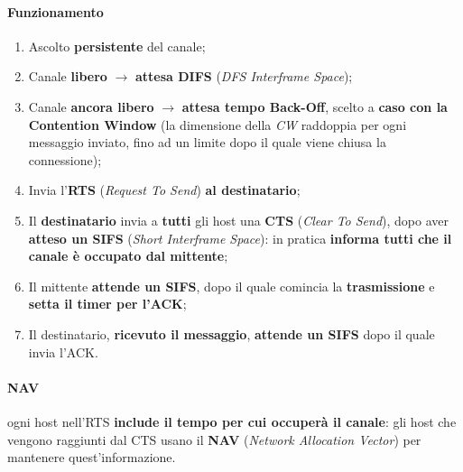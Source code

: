 \documentclass[a4paper]{article}
\begin{document}
			\paragraph{Funzionamento}
				\begin{enumerate}
					\item Ascolto \textbf{persistente} del canale;
					\item Canale \textbf{libero} $ \rightarrow $ \textbf{attesa DIFS} (\emph{DFS Interframe Space});
					\item Canale \textbf{ancora libero} $ \rightarrow $ \textbf{attesa tempo Back-Off}, scelto a \textbf{caso con la Contention Window} (la dimensione della \emph{CW} raddoppia per ogni messaggio inviato, fino ad un limite dopo il quale viene chiusa la connessione);
					\item Invia l'\textbf{RTS} (\emph{Request To Send}) \textbf{al destinatario};
					\item Il \textbf{destinatario} invia a \textbf{tutti} gli host una \textbf{CTS} (\emph{Clear To Send}), dopo aver \textbf{atteso un SIFS} (\emph{Short Interframe Space}): in pratica \textbf{informa tutti che il canale è occupato dal mittente};
					\item Il mittente \textbf{attende un SIFS}, dopo il quale comincia la \textbf{trasmissione} e \textbf{setta il timer per l'ACK};
					\item Il destinatario, \textbf{ricevuto il messaggio}, \textbf{attende un SIFS} dopo il quale invia l'ACK.
				\end{enumerate}					 
					
			\paragraph{NAV}
				ogni host nell'RTS \textbf{include il tempo per cui occuperà il canale}: gli host che vengono raggiunti dal CTS usano il \textbf{NAV} (\emph{Network Allocation Vector}) per mantenere quest'informazione.
					
\end{document}

